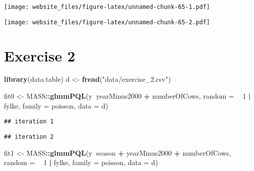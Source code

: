 \documentclass[]{book}
\newenvironment{Shaded}{\begin{snugshade}}{\end{snugshade}}
\newcommand{\KeywordTok}[1]{\textcolor[rgb]{0.13,0.29,0.53}{\textbf{#1}}}
\newcommand{\DataTypeTok}[1]{\textcolor[rgb]{0.13,0.29,0.53}{#1}}
\newcommand{\DecValTok}[1]{\textcolor[rgb]{0.00,0.00,0.81}{#1}}
\newcommand{\StringTok}[1]{\textcolor[rgb]{0.31,0.60,0.02}{#1}}
\newcommand{\OperatorTok}[1]{\textcolor[rgb]{0.81,0.36,0.00}{\textbf{#1}}}
\newcommand{\ErrorTok}[1]{\textcolor[rgb]{0.64,0.00,0.00}{\textbf{#1}}}
\newcommand{\NormalTok}[1]{#1}
\begin{document}
\begin{Shaded}
\end{Shaded}

\texttt{[image: website\_files/figure-latex/unnamed-chunk-65-1.pdf]}

\begin{Shaded}
\end{Shaded}

\texttt{[image: website\_files/figure-latex/unnamed-chunk-65-2.pdf]}

\newpage

\section{Exercise 2}\label{exercise-2-1}

\begin{Shaded}
\begin{Highlighting}[]
\KeywordTok{library}\NormalTok{(data.table)}
\NormalTok{d <-}\StringTok{ }\KeywordTok{fread}\NormalTok{(}\StringTok{"data/exercise_2.csv"}\NormalTok{)}

\NormalTok{fit0 <-}\StringTok{ }\NormalTok{MASS}\OperatorTok{::}\KeywordTok{glmmPQL}\NormalTok{(y}\OperatorTok{~}\NormalTok{yearMinus2000 }\OperatorTok{+}\StringTok{ }\NormalTok{numberOfCows, }\DataTypeTok{random =} \OperatorTok{~}\StringTok{ }\DecValTok{1} \OperatorTok{|}\StringTok{ }\NormalTok{fylke,}
                \DataTypeTok{family =}\NormalTok{ poisson, }\DataTypeTok{data =}\NormalTok{ d)}
\end{Highlighting}
\end{Shaded}

\begin{verbatim}
## iteration 1
\end{verbatim}

\begin{verbatim}
## iteration 2
\end{verbatim}

\begin{Shaded}
\begin{Highlighting}[]
\NormalTok{fit1 <-}\StringTok{ }\NormalTok{MASS}\OperatorTok{::}\KeywordTok{glmmPQL}\NormalTok{(y}\OperatorTok{~}\NormalTok{season }\OperatorTok{+}\StringTok{ }\NormalTok{yearMinus2000 }\OperatorTok{+}\StringTok{ }\NormalTok{numberOfCows, }\DataTypeTok{random =} \OperatorTok{~}\StringTok{ }\DecValTok{1} \OperatorTok{|}\StringTok{ }\NormalTok{fylke,}
                \DataTypeTok{family =}\NormalTok{ poisson, }\DataTypeTok{data =}\NormalTok{ d)}
\end{Highlighting}
\end{Shaded}
\end{document}
